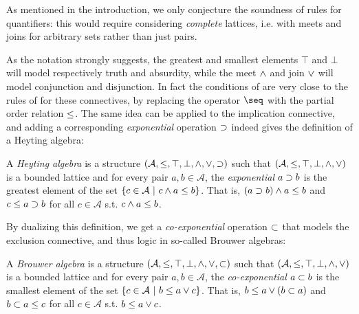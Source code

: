 \begin{remark}
  As mentioned in the introduction, we only conjecture the soundness of rules
  for quantifiers: this would require considering \emph{complete} lattices, i.e.
  with meets and joins for arbitrary sets rather than just pairs.
\end{remark}

As the notation strongly suggests, the greatest and smallest elements $\top$ and
$\bot$ will model respectively truth and absurdity, while the meet $\land$ and
join $\lor$ will model conjunction and disjunction. In fact the conditions of
 are very close to the rules of 
for these connectives, by replacing the  operator $\seq$ with the partial
order relation $\leq$. The same idea can be applied to the implication
connective, and adding a corresponding \emph{exponential} operation $\supset$
indeed gives the definition of a Heyting algebra:

\begin{definition}
  A \emph{Heyting algebra} is a structure $(\mathcal{A}, \leq, \top, \bot,
  \land, \lor, \supset)$ such that $(\mathcal{A}, \leq, \top, \bot,
  \land, \lor)$ is a bounded lattice and for every pair $a, b \in
  \mathcal{A}$, the \emph{exponential} $a \supset b$ is the greatest element of
  the set $\left\{c \in \mathcal{A} ~\middle|~ c \land a \leq b\right\}$. That is, $(a \supset
  b) \land a \leq b$ and $c \leq a \supset b$ for all $c \in \mathcal{A}$
  s.t. $c \land a \leq b$.
\end{definition}

By dualizing this definition, we get a \emph{co-exponential} operation $\subset$
that models the exclusion connective, and thus  logic in
so-called Brouwer algebras:

\begin{definition}
  A \emph{Brouwer algebra} is a structure $(\mathcal{A}, \leq, \top, \bot,
  \land, \lor, \subset)$ such that $(\mathcal{A}, \leq, \top, \bot,
  \land, \lor)$ is a bounded lattice and for every pair $a, b \in
  \mathcal{A}$, the \emph{co-exponential} $a \subset b$ is the smallest element
  of the set $\left\{c \in \mathcal{A} ~\middle|~ b \leq a \lor c\right\}$. That is, $b
  \leq a \lor (b \subset a)$ and $b \subset a \leq c$ for all $c \in
  \mathcal{A}$ s.t. $b \leq a \lor c$.
\end{definition}

